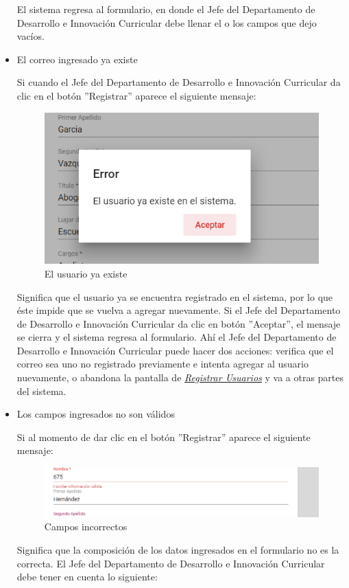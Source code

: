 \begin{itemize}
	El sistema regresa al formulario, en donde el Jefe del Departamento de Desarrollo e Innovación Curricular debe llenar el o los campos que dejo vacíos.
	
	\item El correo ingresado ya existe
	
	Si cuando el Jefe del Departamento de Desarrollo e Innovación Curricular da clic en el botón ''Registrar'' aparece el siguiente mensaje:
	
	\begin{figure}[H]
		\centering
		\includegraphics[width=0.4\linewidth]{images/SP5/MSG36}
		\caption{El usuario ya existe}
		\label{mensaje36}
		
	\end{figure}
	
	Significa que el usuario ya se encuentra registrado en el sistema, por lo que éste impide que se vuelva a agregar nuevamente. Si el Jefe del Departamento de Desarrollo e Innovación Curricular da clic en botón ''Aceptar'', el mensaje se cierra y el sistema regresa al formulario. Ahí el Jefe del Departamento de Desarrollo e Innovación Curricular  puede hacer dos acciones: verifica que el correo sea uno no registrado previamente e intenta agregar al usuario nuevamente, o abandona la pantalla de \hyperlink{registrarUs}{\textit{Registrar Usuarios}} y va a otras partes del sistema.
	\newpage
	\item Los campos ingresados no son válidos
	
	Si al momento de dar clic en el botón ''Registrar'' aparece el siguiente mensaje:
	\begin{figure}[H]
		\centering
		\includegraphics[width=0.4\linewidth]{images/SP5/MSG35}
		\caption{Campos incorrectos}
		\label{mensaje35}
		
	\end{figure}
	
	Significa que la composición de los datos ingresados en el formulario no es la correcta. El Jefe del Departamento de Desarrollo e Innovación Curricular debe tener en cuenta lo siguiente:
	

\end{itemize}
